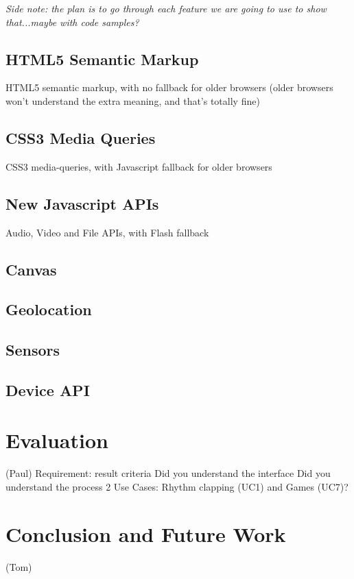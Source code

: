 \documentclass[runningheads,a4paper]{llncs}
\begin{document}
\emph{Side note: the plan is to go through each feature we are going to use to show that...maybe with code samples?}

\subsection{HTML5 Semantic Markup} 

HTML5 semantic markup, with no fallback for older browsers (older browsers won't understand the extra meaning, and that's totally fine)

\subsection{CSS3 Media Queries} 

CSS3 media-queries, with Javascript fallback for older browsers

\subsection{New Javascript APIs}

 Audio, Video and File APIs, with Flash fallback

\subsection{Canvas}

\subsection{Geolocation}

\subsection{Sensors}

\subsection{Device API}


\section{Evaluation}
(Paul)
Requirement: result criteria
Did you understand the interface
Did you understand the process
2 Use Cases: Rhythm clapping (UC1) and Games (UC7)?

\section{Conclusion and Future Work}
(Tom)



\end{document}
